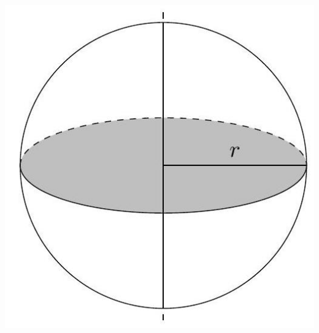 \documentclass[10pt]{article}
\begin{document}
\begin{center}
\includegraphics[max width=\textwidth]{2024_11_21_e9b4faa005d5be2cc318g-098}
\end{center}
\end{document}
